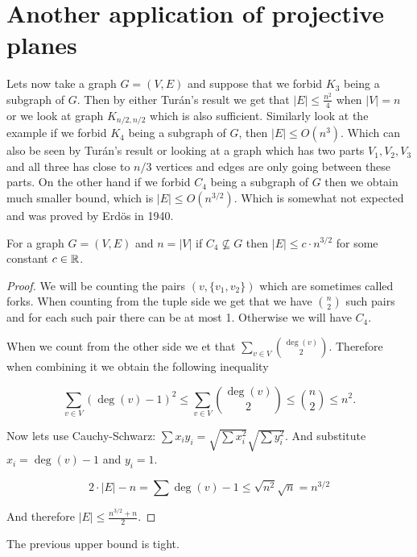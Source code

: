 \section{Another application of projective planes}

Lets now take a graph $G = (V,E)$ and suppose that we forbid $K_3$ being a subgraph of $G$. Then by either Turán's result we get that $|E| \leq \frac{n^2}{4}$ when $|V| = n$ or we look at graph $K_{n/2,n/2}$ which is also sufficient. Similarly look at the example if we forbid $K_4$ being a subgraph of $G$, then $|E| \leq O(n^3)$. Which can also be seen by Turán's result or looking at a graph which has two parts $V_1, V_2, V_3$ and all three has close to $n/3$ vertices and edges are only going between these parts. On the other hand if we forbid $C_4$ being a subgraph of $G$ then we obtain much smaller bound, which is $|E| \leq O(n^{3/2})$. Which is somewhat not expected and was proved by Erdös in 1940.

\begin{prop}
	For a graph $G = (V,E)$ and $n = |V|$ if $C_4 \not\subseteq G$ then $|E| \leq c \cdot n^{3/2}$ for some constant $c \in \mathbb{R}$.
\end{prop}

\begin{proof}
	We will be counting the pairs $(v, \{v_1,v_2\})$ which are sometimes called forks. When counting from the tuple side we get that we have $\binom{n}{2}$ such pairs and for each such pair there can be at most 1. Otherwise we will have $C_4$.
	
	When we count from the other side we et that $\sum_{v \in V} \binom{\deg(v)}{2}$. Therefore when combining it we obtain the following inequality
	
	$$
	\sum_{v \in V} (\deg(v) -1)^2 \leq \sum_{v \in V} \binom{\deg(v)}{2} \leq \binom{n}{2} \leq n^2.
	$$
	
	Now lets use Cauchy-Schwarz: $\sum x_i y_i = \sqrt{\sum x_i^2} \sqrt{\sum y_i^2}$. And substitute $x_i = \deg(v) -1$ and $y_i = 1$.
	
	$$
	2 \cdot |E| - n = \sum \deg(v) - 1 \leq \sqrt{n^2} \sqrt{n} = n^{3/2}
	$$
	
	And therefore $|E| \leq \frac{n^{3/2} + n}{2}$.
\end{proof}

\begin{prop}
	The previous upper bound is tight.
\end{prop}


